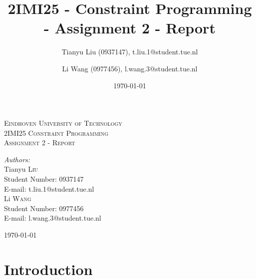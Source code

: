 \documentclass[a4paper, 12pt]{article}
\title{2IMI25 - Constraint Programming - Assignment 2 - Report}
\author{Tianyu Liu (0937147), t.liu.1@student.tue.nl \and Li Wang (0977456), l.wang.3@student.tue.nl}
\date{\today}
\begin{document}
\begin{titlepage}
    \newcommand{\HRule}{\rule{\linewidth}{0.5mm}} %
    \centering
    \textsc{\LARGE Eindhoven University of Technology}\\[1.5cm]
    \textsc{\Large 2IMI25 Constraint Programming}\\[1.5cm]
    \textsc{\large Assignment 2 - Report}\\[3cm]
    \begin{minipage}{0.4\textwidth}
        \begin{flushleft} \large
            \emph{Authors:}\\ [0.5cm]
            Tianyu \textsc{Liu}\\
            Student Number: 0937147\\
            E-mail: t.liu.1@student.tue.nl\\ [0.2cm]
            Li \textsc{Wang}\\
            Student Number: 0977456\\
            E-mail: l.wang.3@student.tue.nl\\ [0.2cm]
        \end{flushleft}
    \end{minipage}
    
    \vspace{15ex}
    {\large \today}\\[3cm] %
    \vfill
\end{titlepage}

\setcounter{page}{1} 

\tableofcontents

\newpage 


\section{Introduction}
\end{document}
